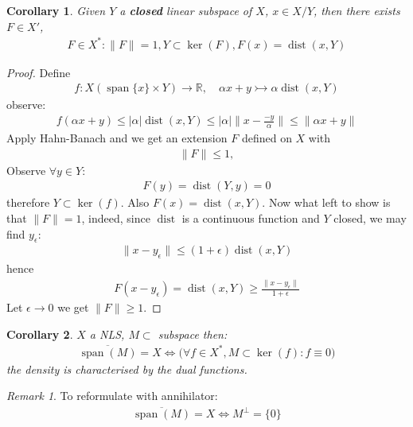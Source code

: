 \documentclass[a4paper,11pt,fleqn]{book}
\newtheorem{corollary}{Corollary}[theorem]
\theoremstyle{definition}
\theoremstyle{remark}
\newtheorem*{remark}{Remark}
\DeclareMathOperator*{\spa}{span}
\DeclareMathOperator*{\dist}{dist}
\begin{document}
\begin{corollary}
	Given $Y$ a \textbf{closed} linear subspace of $X$, $x \in X \slash Y$, then
there exists $F \in X'$,
	\begin{align*}
		F \in X^*: \|F\| = 1, Y \subset \ker(F), F(x) = \dist(x, Y)
	\end{align*}
\end{corollary}
\begin{proof}
	Define
\begin{align*}
	f: X (\spa\{x\} \times Y) \rightarrow \mathbb{R}, \quad
	\alpha x + y \rightarrowtail \alpha \dist(x, Y)
\end{align*}
observe:
\begin{align*}
	f(\alpha x + y) \le  |\alpha| \dist(x, Y) \le |\alpha| \|x - \frac{-y}{\alpha }\| \le \|\alpha x + y\|
\end{align*}
Apply Hahn-Banach and we get an extension $F$ defined on $X$ with  
\begin{align*}
	\|F\| \le 1, 
\end{align*}
Observe $\forall y \in Y$:
\begin{align*}
	F(y) = \dist(Y, y) = 0
\end{align*}
therefore $Y \subset \ker(f)$. Also $F(x) = \dist(x, Y)$.
Now what left to show is that $\|F\| = 1$, indeed, since $\dist$ is a continuous function and $Y$ closed, we may find $y_\epsilon$:
\begin{align*}
	\|x - y_\epsilon \| \le (1 + \epsilon) \dist(x, Y)
\end{align*}
hence
\begin{align*}
	F(x - y_\epsilon) = \dist(x, Y) \geq\frac{\|x - y_\epsilon\|}{1 + \epsilon}
\end{align*}
Let $\epsilon \rightarrow 0$ we get $\|F\| \geq 1$.
\end{proof}

\begin{corollary}
	$X$ a NLS, $M \subset $ subspace then:
	\begin{align*}
		\overline{\spa(M)} = X \Leftrightarrow \bigg( \forall f \in X^*, M \subset \ker(f): f \equiv 0 \bigg)
	\end{align*}
	the density is characterised by the dual functions.
\end{corollary}
\begin{remark}
To reformulate with annihilator:
\begin{align*}
	\overline{\spa(M)} = X \Leftrightarrow {} M^\perp = \{0\}
\end{align*}
\end{remark}
\end{document}
